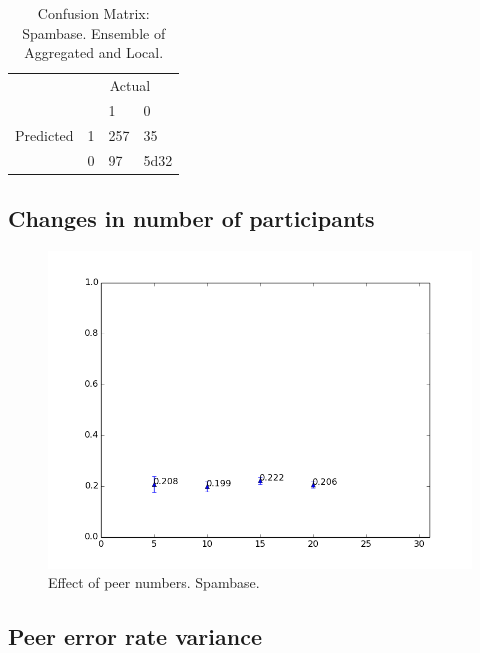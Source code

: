 \begin{table}[h]
	\centering
	\begin{tabular}{llll}
		& \multicolumn{3}{c}{Actual} \\
		\multicolumn{1}{c}{} &                        & 1                         & 0                          \\ \cline{3-4} 
		Predicted            & \multicolumn{1}{l|}{1} & \multicolumn{1}{l|}{257} & \multicolumn{1}{l|}{35}   \\ \cline{3-4} 
		& \multicolumn{1}{l|}{0} & \multicolumn{1}{l|}{97} & \multicolumn{1}{l|}{5d32} \\ \cline{3-4} 
	\end{tabular}
	\caption{Confusion Matrix: Spambase. Ensemble of Aggregated and Local.}
	\label{fig:confmat_spamd_ensemble}
\end{table}

\subsection{Changes in number of participants}


\begin{figure}[H]
	\centering
	\includegraphics[width=\textwidth]{fig/spambase/eps1.0,bud1.0,peers5-30,groups5,reg2e-2-puball-peercounts-data150-spam-testmean}
	\caption{Effect of peer numbers. Spambase.}
	\label{fig:peer_range_constant_group_spam}
\end{figure}


\subsection{Peer error rate variance}

